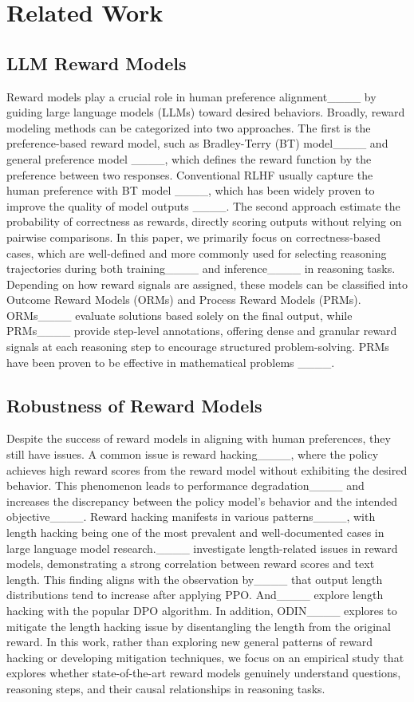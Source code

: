\section{Related Work}
\label{sec:related}

\subsection{LLM Reward Models}
Reward models play a crucial role in human preference alignment____ by guiding large language models (LLMs) toward desired behaviors. Broadly, reward modeling methods can be categorized into two approaches.
The first is the preference-based reward model, such as Bradley-Terry (BT) model____ and general preference model ____, which defines the reward function by the preference between two responses.
Conventional RLHF usually capture the human preference with BT model ____, which has been widely proven to improve the quality of model outputs ____.
The second approach estimate the probability of correctness as rewards, directly scoring outputs without relying on pairwise comparisons. 
In this paper, we primarily focus on correctness-based cases, which are well-defined and more commonly used for selecting reasoning trajectories during both training____ and inference____ in reasoning tasks. Depending on how reward signals are assigned, these models can be classified into Outcome Reward Models (ORMs) and Process Reward Models (PRMs). ORMs____ evaluate solutions based solely on the final output, while PRMs____ provide step-level annotations, offering dense and granular reward signals at each reasoning step to encourage structured problem-solving. PRMs have been proven to be effective in mathematical problems ____. 



\subsection{Robustness of Reward Models}
Despite the success of reward models in aligning with human preferences, they still have issues. A common issue is reward hacking____, where the policy achieves high reward scores from the reward model without exhibiting the desired behavior. This phenomenon leads to performance degradation____ and increases the discrepancy between the policy model's behavior and the intended objective____. 
Reward hacking manifests in various patterns____, with length hacking being one of the most prevalent and well-documented cases in large language model research.____ investigate length-related issues in reward models, demonstrating a strong correlation between reward scores and text length. This finding aligns with the observation by____ that output length distributions tend to increase after applying PPO. And____ explore length hacking with the popular DPO algorithm. In addition, ODIN____ explores to mitigate the length hacking issue by disentangling the length from the original reward.
In this work, rather than exploring new general patterns of reward hacking or developing mitigation techniques, we focus on an empirical study that explores whether state-of-the-art reward models genuinely understand questions, reasoning steps, and their causal relationships in reasoning tasks.